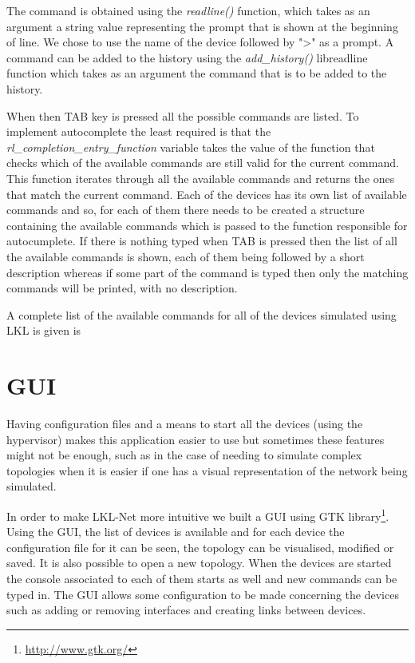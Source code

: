 {{The command is obtained using the \textit{readline()} function, which takes as an argument a string value representing the prompt that is shown at the beginning of line. We chose to use the name of the device followed by ">" as a prompt. A command can be added to the history using the \textit{add_history()} libreadline function which takes as an argument the command that is to be added to the history.

When then TAB key is pressed all the possible commands are listed. To implement autocomplete the least required is that the \textit{rl_completion_entry_function} variable takes the value of the function that checks which of the available commands are still valid for the current command. This function iterates through all the available commands and returns the ones that match the current command. Each of the devices has its own list of available commands and so, for each of them there needs to be created a structure containing the available commands which is passed to the function responsible for autocumplete. If there is nothing typed when TAB is pressed then the list of all the available commands is shown, each of them being followed by a short description whereas if some part of the command is typed then only the matching commands will be printed, with no description.

A complete list of the available commands for all of the devices simulated using LKL is given is 

\section{GUI}
\label{sec:gui}
Having configuration files and a means to start all the devices (using the hypervisor) makes this application easier to use but sometimes these features might not be enough, such as in the case of needing to simulate complex topologies when it is easier if one has a visual representation of the network being simulated.

In order to make LKL-Net more intuitive we built a GUI using GTK library\footnote{\url{http://www.gtk.org/}}. Using the GUI, the list of devices is available and for each device the configuration file for it can be seen, the topology can be visualised, modified or saved. It is also possible to open a new topology. When the devices are started the console associated to each of them starts as well and new commands can be typed in. The GUI allows some configuration to be made concerning the devices such as adding or removing interfaces and creating links between devices.

}}
